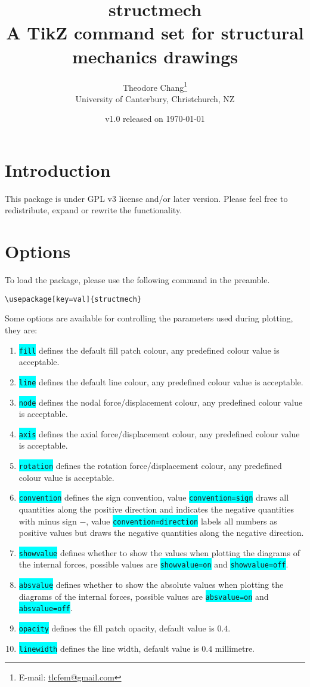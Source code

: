 \documentclass[10pt,a4paper]{article}
\title{structmech\\\large{}A TikZ command set for structural mechanics drawings}
\author{Theodore Chang\footnote{E-mail: \href{tlcfem@gmail.com}{tlcfem@gmail.com}}\\[2mm]\normalsize{}University of Canterbury, Christchurch, NZ}
\date{\normalsize{}v1.0 released on \today}
\newcommand*{\Highlight}[1]{\colorbox{cyan}{\color{red}\texttt{#1}}}
\begin{document}
\maketitle
\section{Introduction}
This package is under GPL v3 license and/or later version. Please feel free to redistribute, expand or rewrite the functionality.
\section{Options}
To load the package, please use the following command in the preamble.
\begin{Verbatim}[frame=single,label=Syntax]
\usepackage[key=val]{structmech}
\end{Verbatim}
Some options are available for controlling the parameters used during plotting, they are:
\begin{enumerate}
\item \Highlight{fill} defines the default fill patch colour, any predefined colour value is acceptable.
\item \Highlight{line} defines the default line colour, any predefined colour value is acceptable.
\item \Highlight{node} defines the nodal force/displacement colour, any predefined colour value is acceptable.
\item \Highlight{axis} defines the axial force/displacement colour, any predefined colour value is acceptable.
\item \Highlight{rotation} defines the rotation force/displacement colour, any predefined colour value is acceptable.
\item \Highlight{convention} defines the sign convention, value \Highlight{convention=sign} draws all quantities along the positive direction and indicates the negative quantities with minus sign $-$, value \Highlight{convention=direction} labels all numbers as positive values but draws the negative quantities along the negative direction.
\item \Highlight{showvalue} defines whether to show the values when plotting the diagrams of the internal forces, possible values are \Highlight{showvalue=on} and \Highlight{showvalue=off}.
\item \Highlight{absvalue} defines whether to show the absolute values when plotting the diagrams of the internal forces, possible values are \Highlight{absvalue=on} and \Highlight{absvalue=off}.
\item \Highlight{opacity} defines the fill patch opacity, default value is $0.4$.
\item \Highlight{linewidth} defines the line width, default value is $0.4$ millimetre.
\end{enumerate}
\end{document}

